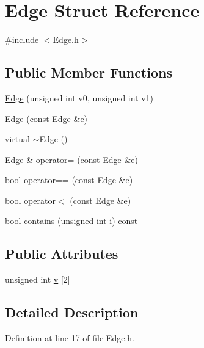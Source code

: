 \hypertarget{struct_edge}{
\section{Edge Struct Reference}
\label{struct_edge}
}


{\ttfamily \#include $<$Edge.h$>$}

\subsection*{Public Member Functions}
\begin{DoxyCompactItemize}
\item 
\hyperlink{struct_edge_ae799059b5cf7b3a658f5a1f1aae9ac9c}{Edge} (unsigned int v0, unsigned int v1)
\item 
\hyperlink{struct_edge_a70ed9f4d5f93c9cc5273a34361781532}{Edge} (const \hyperlink{struct_edge}{Edge} \&e)
\item 
virtual \hyperlink{struct_edge_a9f21951543c1c48c6e23e36eac61671f}{$\sim$Edge} ()
\item 
\hyperlink{struct_edge}{Edge} \& \hyperlink{struct_edge_a2fba79ccfba97323171b31c7f395c969}{operator=} (const \hyperlink{struct_edge}{Edge} \&e)
\item 
bool \hyperlink{struct_edge_ae7d4e4cdbf2023b9dfa1c8162ace412f}{operator==} (const \hyperlink{struct_edge}{Edge} \&e)
\item 
bool \hyperlink{struct_edge_a1f5f87db716a267d8c7243d42d00fb66}{operator$<$} (const \hyperlink{struct_edge}{Edge} \&e)
\item 
bool \hyperlink{struct_edge_a9299b6cacd09cfb078165e512ccd756d}{contains} (unsigned int i) const 
\end{DoxyCompactItemize}
\subsection*{Public Attributes}
\begin{DoxyCompactItemize}
\item 
unsigned int \hyperlink{struct_edge_aa4a9380430efd1ae82616f7ef75a281c}{v} \mbox{[}2\mbox{]}
\end{DoxyCompactItemize}


\subsection{Detailed Description}


Definition at line 17 of file Edge.h.



